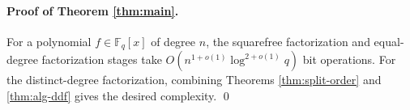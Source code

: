 \documentclass{article}
\theoremstyle{plain}
\theoremstyle{definition}
\def\F{\ensuremath{\mathbb{F}}}
\begin{document}
\paragraph{Proof of Theorem \ref{thm:main}.}
For a polynomial $f \in \F_q[x]$ of degree $n$, the squarefree factorization and equal-degree 
factorization stages take $O(n^{1 + o(1)}\log^{2 + o(1)}q)$ bit operations. For the distinct-degree 
factorization, combining Theorems \ref{thm:split-order} and \ref{thm:alg-ddf} gives the desired 
complexity. \hfil \qed






\end{document}
